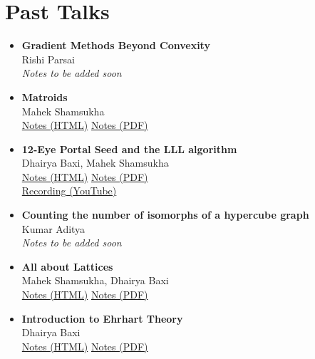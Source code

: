 \documentclass[12pt]{article}
\begin{document}

\section*{Past Talks}

\begin{itemize}
    \item \textbf{Gradient Methods Beyond Convexity} \\
    Rishi Parsai \\
    \textit{Notes to be added soon}

    \item \textbf{Matroids} \\
    Mahek Shamsukha \\
    \href{topics/2026/5/}{Notes (HTML)} \quad
    \href{topics/2026/5/index.pdf}{Notes (PDF)}

    \item \textbf{12-Eye Portal Seed and the LLL algorithm} \\
    Dhairya Baxi, Mahek Shamsukha \\
    \href{topics/2026/4/}{Notes (HTML)} \quad
    \href{topics/2026/4/index.pdf}{Notes (PDF)}\\
    \href{https://www.youtube.com/watch?v=hBQbVrYqDx0}{Recording (YouTube)}

    \item \textbf{Counting the number of isomorphs of a hypercube graph} \\
    Kumar Aditya \\
    \textit{Notes to be added soon}

    \item \textbf{All about Lattices} \\
    Mahek Shamsukha, Dhairya Baxi \\
    \href{topics/2026/2/}{Notes (HTML)} \quad
    \href{topics/2026/2/index.pdf}{Notes (PDF)}

    \item \textbf{Introduction to Ehrhart Theory} \\
    Dhairya Baxi \\
    \href{topics/2026/1/}{Notes (HTML)} \quad
    \href{topics/2026/1/index.pdf}{Notes (PDF)}

\end{itemize}

\end{document}

